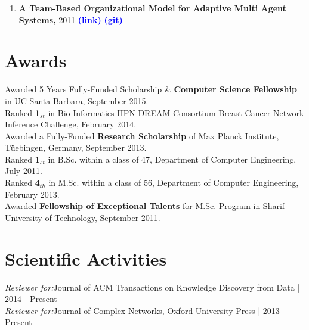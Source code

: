 \documentclass[letter]{res}
\begin{document}
\begin{resume}
\begin{enumerate}[leftmargin=-.01in]
\item \textbf{A Team-Based Organizational Model for Adaptive Multi Agent Systems,} 2011
{\href{https://www.researchgate.net/publication/221539731_A_Team-based_Organizational_Model_for_Adaptive_Multi-agent_Systems}{\textbf{\textcolor{blue}{(link)}}}}
{\href{https://github.com/omid55/team_based_rescue_jade_multi_agent_system}{\textbf{\textcolor{blue}{(git)}}}}

\end{enumerate}


\section{Awards}
Awarded 5 Years Fully-Funded Scholarship \& \textbf{Computer Science Fellowship} in UC Santa Barbara, September 2015.\\
Ranked \textbf{1}$_{st}$ in Bio-Informatics HPN-DREAM Consortium Breast Cancer Network Inference Challenge, February 2014.\\
Awarded a Fully-Funded \textbf{Research Scholarship} of Max Planck Institute, Tüebingen, Germany, September 2013.\\
Ranked \textbf{1}$_{st}$ in B.Sc. within a class of 47, Department of Computer Engineering, July 2011.\\
Ranked \textbf{4}$_{th}$ in M.Sc. within a class of 56, Department of Computer Engineering, February 2013.\\
Awarded \textbf{Fellowship of Exceptional Talents} for M.Sc. Program in Sharif University of Technology, September 2011.


\section{Scientific Activities}
{\sl Reviewer for:}Journal of ACM Transactions on Knowledge Discovery from Data | 2014 - Present\\
{\sl Reviewer for:}Journal of Complex Networks, Oxford University Press | 2013 - Present



\end{resume}
\end{document}
